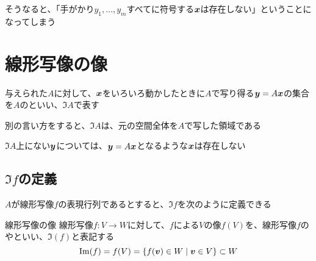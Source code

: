 \documentclass[../../../topic_linear-algebra]{subfiles}
\begin{document}
そうなると、「手がかり$y_1,\ldots,y_m$すべてに符号する$\vb*{x}$は存在しない」ということになってしまう

\sectionline
\section{線形写像の像}

与えられた$A$に対して、$\vb*{x}$をいろいろ動かしたときに$A$で写り得る$\vb*{y} = A\vb*{x}$の集合を$A$のといい、$\Im A$で表す

\br

別の言い方をすると、$\Im A$は、元の空間全体を$A$で写した領域である

$\Im A$上にない$\vb*{y}$については、$\vb*{y} = A\vb*{x}$となるような$\vb*{x}$は存在しない

\subsection{$\Im f$の定義}

$A$が線形写像$f$の表現行列であるとすると、$\Im f$を次のように定義できる

\begin{definition*}{線形写像の像}
  線形写像$f\colon V \to W$に対して、$f$による$V$の像$f(V)$を、線形写像$f$のやといい、$\Im(f)$と表記する
  \begin{equation*}
    \Im(f) = f(V) = \{ f(\vb*{v}) \in W \mid \vb*{v} \in V \} \subset W
  \end{equation*}
\end{definition*}
\end{document}
